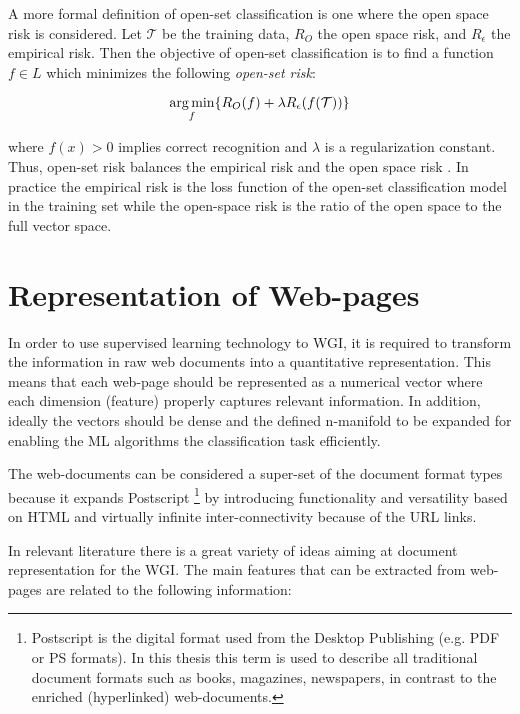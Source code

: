 \begin{itemize}
A more formal definition of open-set classification is one where the open space risk is considered. Let $\mathcal{T}$ be the training data, $R_{O}$ the open space risk, and $R_{\epsilon}$ the empirical risk. Then the objective of open-set classification is to find a function $f \in L$ which minimizes the following \textit{open-set risk}: 

\begin{equation}
\operatorname*{arg\,min}_{f} \{R_{O}(f ) + \lambda R_{\epsilon}(f (\mathcal{T}))\}
\end{equation}

\noindent where $f (x) > 0$ implies correct recognition and $\lambda$ is a regularization constant. Thus, open-set risk balances the empirical risk and the open space risk \parencite{geng2018recent}. In practice the empirical risk is the loss function of the open-set classification model in the training set while the open-space risk is the ratio of the open space to the full vector space.

\section{Representation of Web-pages} \label{chap:introduction:sec:document_representation}

In order to use supervised learning technology to WGI, it is required to transform the information in raw web documents into a quantitative representation. This means that each web-page should be represented as a numerical vector where each dimension (feature) properly captures relevant information. In addition, ideally the vectors should be dense and the defined n-manifold to be expanded for enabling the ML algorithms the classification task efficiently. 

The web-documents can be considered a super-set of the document format types because it expands Postscript \footnote{Postscript is the digital format used from the Desktop Publishing (e.g. PDF or PS formats). In this thesis this term is used to describe all traditional document formats such as books, magazines, newspapers, in contrast to the enriched (hyperlinked) web-documents.} by introducing functionality and versatility based on HTML and virtually infinite inter-connectivity because of the URL links. 

In relevant literature there is a great variety of ideas aiming at document representation for the WGI. The main features that can be extracted from web-pages are related to the following information:


\end{itemize}
